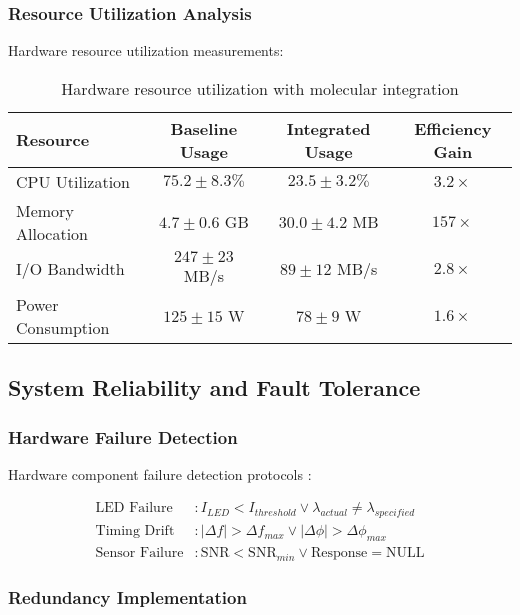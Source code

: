 \subsubsection{Resource Utilization Analysis}

Hardware resource utilization measurements:

\begin{table}[H]
\centering
\begin{tabular}{|l|c|c|c|}
\hline
\textbf{Resource} & \textbf{Baseline Usage} & \textbf{Integrated Usage} & \textbf{Efficiency Gain} \\
\hline
CPU Utilization & $75.2 \pm 8.3\%$ & $23.5 \pm 3.2\%$ & $3.2 \times$ \\
Memory Allocation & $4.7 \pm 0.6$ GB & $30.0 \pm 4.2$ MB & $157 \times$ \\
I/O Bandwidth & $247 \pm 23$ MB/s & $89 \pm 12$ MB/s & $2.8 \times$ \\
Power Consumption & $125 \pm 15$ W & $78 \pm 9$ W & $1.6 \times$ \\
\hline
\end{tabular}
\caption{Hardware resource utilization with molecular integration}
\end{table}

\subsection{System Reliability and Fault Tolerance}

\subsubsection{Hardware Failure Detection}

Hardware component failure detection protocols \cite{koren2007fault}:

\begin{align}
\text{LED Failure} &: I_{LED} < I_{threshold} \lor \lambda_{actual} \neq \lambda_{specified} \\
\text{Timing Drift} &: |\Delta f| > \Delta f_{max} \lor |\Delta \phi| > \Delta \phi_{max} \\
\text{Sensor Failure} &: \text{SNR} < \text{SNR}_{min} \lor \text{Response} = \text{NULL}
\end{align}

\subsubsection{Redundancy Implementation}

